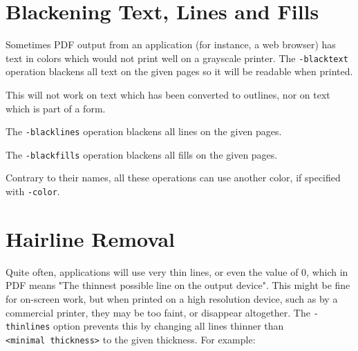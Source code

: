 \documentclass{book}
\begin{document}
\noindent{}

  \section{Blackening Text, Lines and Fills}
  Sometimes PDF output from an application (for instance, a web browser) has
text in colors which would not print well on a grayscale printer. The
\texttt{-blacktext} operation blackens all text on the given pages so it will be readable
when printed.

  This will not work on text which has been converted to outlines, nor on text
which is part of a form.

\noindent{}


\noindent The \texttt{-blacklines} operation blackens all lines on the given pages.

\noindent{}


\noindent The \texttt{-blackfills} operation blackens all fills on the given pages.

\noindent{}

\noindent Contrary to their names, all these operations can use another color, if specified with \texttt{-color}.


  \section{Hairline Removal}
  Quite often, applications will use very thin lines, or even the value of 0,
which in PDF means "The thinnest possible line on the output device". This
might be fine for on-screen work, but when printed on a high resolution device,
such as by a commercial printer, they may be too faint, or disappear
altogether. The \texttt{-thinlines} option prevents this by changing all lines
thinner than \texttt{<minimal~thickness>} to the given thickness. For example:
\end{document}
